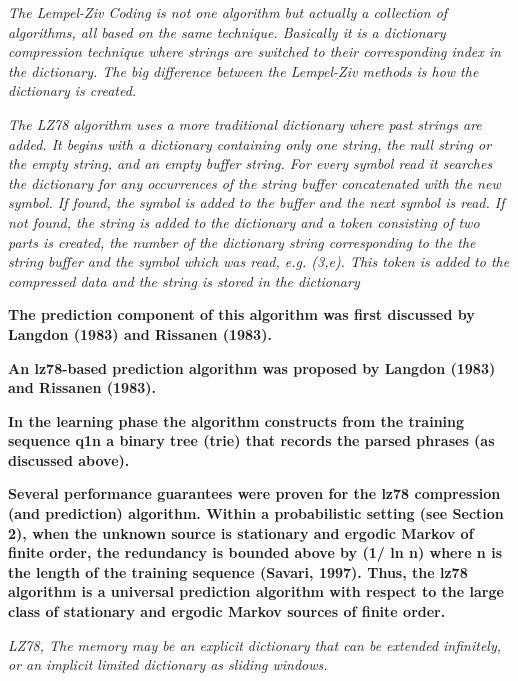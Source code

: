 \emph{The Lempel-Ziv Coding is not one algorithm but actually a collection of algorithms, all based on the same technique. Basically it is a dictionary compression technique where strings are switched to their corresponding index in the dictionary. The big difference between the Lempel-Ziv methods is how the dictionary is created. }~\cite{Mans Andersson}

\emph{The LZ78 algorithm uses a more traditional dictionary where past strings are added. It begins with a dictionary containing only one string, the null string or the empty string, and an empty buffer string. For every symbol read it searches the dictionary for any occurrences of the string buffer concatenated with the new symbol. If found, the symbol is added to the buffer and the next symbol is read. If not found, the string is added to the dictionary and a token consisting of two parts is created, the number of the dictionary string corresponding to the the string buffer and the symbol which was read, e.g. (3,e). This token is added to the compressed data and the string is stored in the dictionary}~\cite{Mans Andersson}



\textbf{The prediction component of this algorithm was first discussed by Langdon (1983) and Rissanen (1983).}~\cite{Begleiter2004}

 
\textbf{An lz78-based prediction algorithm was proposed by Langdon (1983) and Rissanen (1983).}~\cite{Begleiter2004}


\textbf{In the learning phase the algorithm constructs from the training sequence q1n a binary tree (trie) that records the parsed phrases (as discussed above).}~\cite{Begleiter2004}

\textbf{Several performance guarantees were proven for the lz78 compression (and prediction)
algorithm. Within a probabilistic setting (see Section 2), when the unknown source is stationary and ergodic Markov of finite order, the redundancy is bounded above by (1/ ln n) where n is the length of the training sequence (Savari, 1997). Thus, the lz78 algorithm is a universal prediction algorithm with respect to the large class of stationary and ergodic Markov sources of finite order.}~\cite{Begleiter2004}


\emph{LZ78, The memory may be an explicit dictionary that can be extended infinitely, or an implicit limited dictionary as sliding windows.}~\cite{MengyiPu2006}




\emph{}~\cite{}
\emph{}~\cite{}
\emph{}~\cite{}
\emph{}~\cite{}
\emph{}~\cite{}





